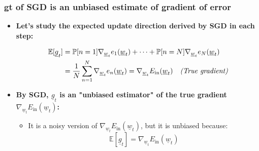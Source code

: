     \subsubsection{gt of SGD is an unbiased estimate of gradient of error}
    \begin{intuition}
        \begin{itemize}
            \item \textbf{Let's study the expected update direction derived by SGD in each step:}

            \begin{align*}
                \mathbb{E}[\underline{g}_t] &= \mathbb{P}[n=1] \nabla_{\underline{w}_t} e_1(\underline{w}_t) + \dots + \mathbb{P}[n=N] \nabla_{\underline{w}_t} e_N(\underline{w}_t) \\
                &= \frac{1}{N} \sum_{n=1}^{N} \nabla_{\underline{w}_t} e_n(\underline{w}_t) = \nabla_{\underline{w}_t} E_{\text{in}}(\underline{w}_t) \quad \text{\textit{(True gradient)}}
            \end{align*}
    
            \item \textbf{By SGD, \( \underline{g}_t \) is an "unbiased estimator" of the true gradient \( \nabla_{\underline{w}_t} E_{\text{in}}(\underline{w}_t) \):}
            \begin{itemize}[left=0pt]
                \item It is a noisy version of \( \nabla_{\underline{w}_t} E_{\text{in}}(\underline{w}_t) \), but it is unbiased because:
                \[
                \mathbb{E}[\underline{g}_t] = \nabla_{\underline{w}_t} E_{\text{in}}(\underline{w}_t)
                \]
            \end{itemize}
        \end{itemize}
    \end{intuition}


